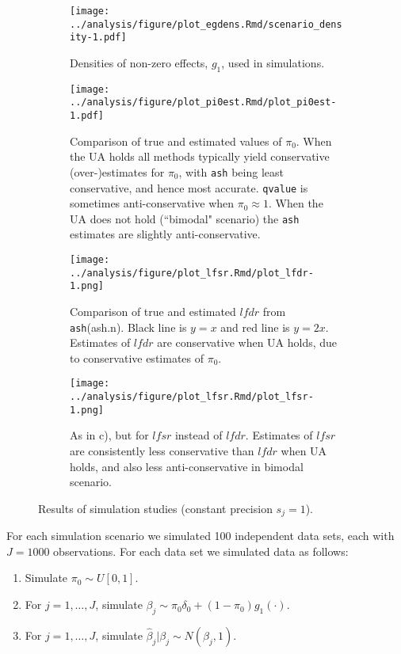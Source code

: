 \documentclass[11pt]{article}
\def\lfdr{\textit{lfdr}}
\def\lfsr{\textit{lfsr}}
\def\bhat{\hat{\beta}}
\def\shat{\hat{s}}
\def\qvalue{{\tt qvalue}\xspace}
\def\ash{{\tt ash}\xspace}
\begin{document}
\begin{figure} 
\begin{center}
\begin{subfigure}{\textwidth}
	\texttt{[image: ../analysis/figure/plot\_egdens.Rmd/scenario\_density-1.pdf]} 
	\caption{Densities of non-zero effects, $g_1$, used in simulations.} \label{fig:altdens}
\end{subfigure}
\begin{subfigure}{\textwidth}
\texttt{[image: ../analysis/figure/plot\_pi0est.Rmd/plot\_pi0est-1.pdf]} 
\caption{Comparison of true and estimated values of $\pi_0$. When the UA holds all methods typically yield conservative (over-)estimates for $\pi_0$, with \ash being least conservative, and hence most accurate. \qvalue is sometimes anti-conservative when $\pi_0 \approx 1$. When the UA does not hold (``bimodal" scenario) the \ash estimates are slightly anti-conservative. } \label{fig:pi0sims}
\end{subfigure}
\begin{subfigure}{\textwidth}
\texttt{[image: ../analysis/figure/plot\_lfsr.Rmd/plot\_lfdr-1.png]} 
\caption{Comparison of true and estimated $\lfdr$ from \ash (ash.n). Black line is $y=x$ and red line is $y=2x$. Estimates of $\lfdr$ are conservative when UA holds, due to conservative estimates of $\pi_0$.} \label{fig:lfdr}
\end{subfigure}
\begin{subfigure}{\textwidth}
\texttt{[image: ../analysis/figure/plot\_lfsr.Rmd/plot\_lfsr-1.png]} 
\caption{As in c), but for $\lfsr$ instead of $\lfdr$. Estimates of $\lfsr$ are consistently less conservative than $\lfdr$ when UA holds, and also less anti-conservative in bimodal scenario.}  \label{fig:lfsr}
\end{subfigure}
\end{center}
\caption{Results of simulation studies (constant precision $s_j=1$).}
\end{figure}


For each simulation scenario we simulated 100 independent data sets, each with $J=1000$ observations. For each data set we simulated
data as follows:
\begin{enumerate}
\item Simulate $\pi_0  \sim U[0,1]$.
\item For $j=1,\dots,J$, simulate $\beta_j \sim \pi_0 \delta_0 + (1-\pi_0) g_1(\cdot)$.
\item For $j=1,\dots,J$, simulate $\bhat_j | \beta_j \sim N(\beta_j,1)$.
\end{enumerate}
\end{document}
